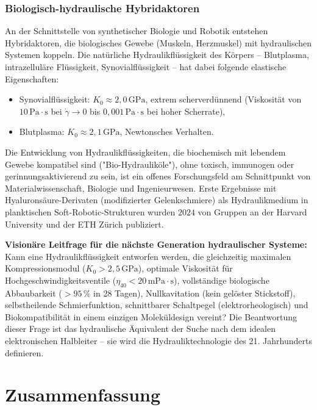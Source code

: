 ﻿\documentclass[a4paper,12pt]{scrreprt}
\theoremstyle{definition}
\begin{document}
\subsubsection{Biologisch-hydraulische Hybridaktoren}

An der Schnittstelle von synthetischer Biologie und Robotik entstehen
Hybridaktoren, die biologisches Gewebe (Muskeln, Herzmuskel) mit
hydraulischen Systemen koppeln. Die natürliche Hydraulikflüssigkeit
des Körpers -- Blutplasma, intrazelluläre Flüssigkeit, Synovialflüssigkeit --
hat dabei folgende elastische Eigenschaften:
\begin{itemize}
  \item Synovialflüssigkeit: $K_0 \approx 2{,}0\,\mathrm{GPa}$,
    extrem scherverdünnend (Viskosität von $10\,\mathrm{Pa\cdot s}$ bei
    $\dot\gamma \to 0$ bis $0{,}001\,\mathrm{Pa\cdot s}$ bei hoher Scherrate),
  \item Blutplasma: $K_0 \approx 2{,}1\,\mathrm{GPa}$, Newtonsches Verhalten.
\end{itemize}
Die Entwicklung von Hydraulikflüssigkeiten, die biochemisch mit lebendem
Gewebe kompatibel sind ("Bio-Hydrauliköle"), ohne toxisch, immuno\-gen
oder gerinnungsaktivierend zu sein, ist ein offenes Forschungsfeld am
Schnittpunkt von Materialwissenschaft, Biologie und Ingenieurwesen.
Erste Ergebnisse mit Hyaluronsäure-Derivaten (modifizierter Gelenkschmiere)
als Hydraulikmedium in planktischen Soft-Robotic-Strukturen wurden
$2024$ von Gruppen an der Harvard University und der ETH Zürich publiziert.

\begin{infobox}
\textbf{Visionäre Leitfrage für die nächste Generation hydraulischer Systeme:}
Kann eine Hydraulikflüssigkeit entworfen werden, die gleichzeitig
maximalen Kompressionsmodul ($K_0 > 2{,}5\,\mathrm{GPa}$), optimale
Viskosität für Hochgeschwindigkeitsventile ($\eta_{40} < 20\,\mathrm{mPa\cdot s}$),
vollständige biologische Abbaubarkeit ($> 95\,\%$ in 28 Tagen),
Nullkavitation (kein gelöster Stickstoff), selbstheilende Schmier\-funktion,
schnittbarer Schaltpegel (elektrorheologisch) und Biokompatibilität
in einem einzigen Moleküldesign vereint? Die Beantwortung dieser Frage
ist das hydraulische Äquivalent der Suche nach dem idealen elektronischen
Halbleiter -- sie wird die Hydrauliktechnologie des 21. Jahrhunderts definieren.
\end{infobox}

\section{Zusammenfassung}
\end{document}

